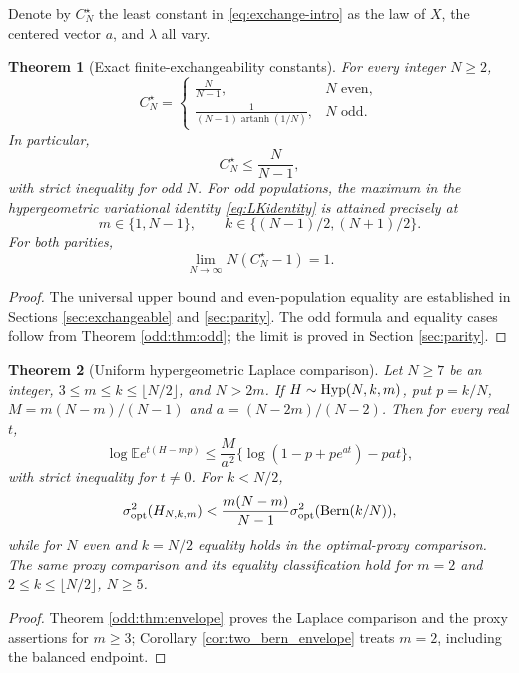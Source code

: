 \documentclass[11pt,a4paper]{article}
\newtheorem{theorem}{Theorem}[section]
\newcommand{\E}{\mathbb E}\newcommand{\R}{\mathbb R}\newcommand{\N}{\mathbb N}\newcommand{\one}{\mathbf1}
\newcommand{\CN}{C_N^\star}
\begin{document}
Denote by $\CN$ the least constant in \eqref{eq:exchange-intro} as the law of $X$, the centered vector $a$, and $\lambda$ all vary.
\begin{theorem}[Exact finite-exchangeability constants]\label{thm:exchange}
For every integer $N\ge2$,
\begin{equation}\label{eq:CNexact}
 \boxed{\quad C_N^\star=\begin{cases}
 \displaystyle\frac{N}{N-1},&N\text{ even},\\[5pt]
 \displaystyle\frac{1}{(N-1)\operatorname{artanh}(1/N)},&N\text{ odd}.
 \end{cases}\quad}
\end{equation}
In particular,
\begin{equation}\label{eq:CNupper}
 C_N^\star\le\frac{N}{N-1},
\end{equation}
with strict inequality for odd $N$. For odd populations, the maximum in the hypergeometric variational identity \eqref{eq:LKidentity} is attained precisely at
\begin{equation}\label{eq:odd_extremizers}
 m\in\{1,N-1\},\qquad k\in\{(N-1)/2,(N+1)/2\}.
\end{equation}
For both parities,
\begin{equation}\label{eq:asymptotic}
 \lim_{N\to\infty}N(C_N^\star-1)=1.
\end{equation}
\end{theorem}
\begin{proof}
The universal upper bound and even-population equality are established in Sections \ref{sec:exchangeable} and \ref{sec:parity}. The odd formula and equality cases follow from Theorem \ref{odd:thm:odd}; the limit is proved in Section \ref{sec:parity}.
\end{proof}

\begin{theorem}[Uniform hypergeometric Laplace comparison]\label{thm:main_laplace}
Let $N\ge7$ be an integer, $3\le m\le k\le\lfloor N/2\rfloor$, and $N>2m$. If $H\sim\operatorname{Hyp}(N,k,m)$, put $p=k/N$, $M=m(N-m)/(N-1)$ and $a=(N-2m)/(N-2)$. Then for every real $t$,
\begin{equation}\label{eq:main_laplace}
 \log\E e^{t(H-mp)}\le\frac{M}{a^2}\{\log(1-p+pe^{at})-pat\},
\end{equation}
with strict inequality for $t\ne0$. For $k<N/2$,
\begin{equation}\label{eq:main_bern_envelope}
 \sigma^2_{\mathrm{opt}}(H_{N,k,m})
 <\frac{m(N-m)}{N-1}\sigma^2_{\mathrm{opt}}(\operatorname{Bern}(k/N)),
\end{equation}
while for $N$ even and $k=N/2$ equality holds in the optimal-proxy comparison. The same proxy comparison and its equality classification hold for $m=2$ and $2\le k\le\lfloor N/2\rfloor$, $N\ge5$.
\end{theorem}
\begin{proof}
Theorem \ref{odd:thm:envelope} proves the Laplace comparison and the proxy assertions for $m\ge3$; Corollary \ref{cor:two_bern_envelope} treats $m=2$, including the balanced endpoint.
\end{proof}
\end{document}
